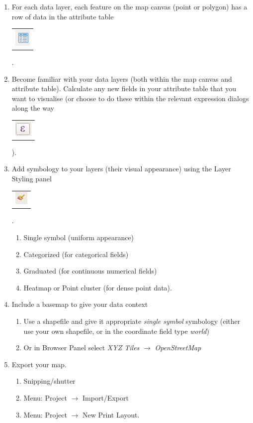 \begin{enumerate}
\begin{enumerate}
\end{enumerate}

	\item 
For each data layer, each feature on the map canvas (point or polygon) has a row of data in the attribute table \begin{tabular}{@{}c@{}}\includegraphics[width=4ex]{images/attribute_table_icon.png}\end{tabular}. 
	\item 
Become familiar with your data layers (both within the map canvas and attribute table). Calculate any new fields in your attribute table that you want to visualise (or choose to do these within the relevant expression dialogs along the way \begin{tabular}{@{}c@{}}\includegraphics[width=4ex]{images/expression_icon.png}\end{tabular}
).

	\item 
Add symbology to your layers (their visual appearance) using the Layer Styling panel \begin{tabular}{@{}c@{}}\includegraphics[width=4ex]{images/layer_styling_panel_icon.png}\end{tabular}.
\begin{enumerate}
	\item
	Single symbol (uniform appearance)
	\item
	Categorized (for categorical fields)
	\item
	Graduated (for continuous numerical fields)
	\item
	Heatmap or Point cluster (for dense point data).
\end{enumerate}
	\item 
Include a basemap to give your data context
\begin{enumerate}
	\item 
Use a shapefile and give it appropriate \textit{single symbol} symbology (either use your own shapefile, or in the coordinate field type \textit{world})
	\item 
Or in Browser Panel select \textit{XYZ Tiles} $\rightarrow$ \textit{OpenStreetMap}
\end{enumerate}
	\item 
Export your map.
\begin{enumerate}
	\item 
Snipping/shutter
	\item 
Menu: Project $\rightarrow$ Import/Export
	\item 
Menu: Project $\rightarrow$ New Print Layout.

\end{enumerate}

\end{enumerate}

